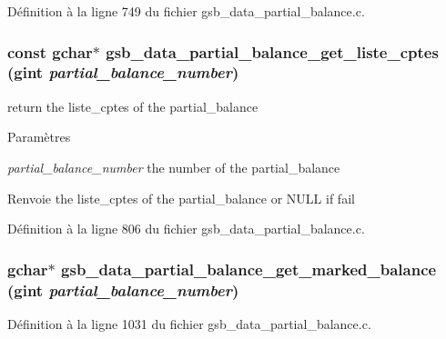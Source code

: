 Définition à la ligne 749 du fichier gsb\_\-data\_\-partial\_\-balance.c.

\subsubsection[{gsb\_\-data\_\-partial\_\-balance\_\-get\_\-liste\_\-cptes}]{\setlength{\rightskip}{0pt plus 5cm}const gchar$\ast$ gsb\_\-data\_\-partial\_\-balance\_\-get\_\-liste\_\-cptes (gint {\em partial\_\-balance\_\-number})}\label{gsb__data__partial__balance_8c_a60c22c649a2f4ff7460ece9208c88bc5}
return the liste\_\-cptes of the partial\_\-balance


\begin{DoxyParams}{Paramètres}
\item[{\em partial\_\-balance\_\-number}]the number of the partial\_\-balance\end{DoxyParams}
\begin{DoxyReturn}{Renvoie}
the liste\_\-cptes of the partial\_\-balance or NULL if fail 
\end{DoxyReturn}


Définition à la ligne 806 du fichier gsb\_\-data\_\-partial\_\-balance.c.

\subsubsection[{gsb\_\-data\_\-partial\_\-balance\_\-get\_\-marked\_\-balance}]{\setlength{\rightskip}{0pt plus 5cm}gchar$\ast$ gsb\_\-data\_\-partial\_\-balance\_\-get\_\-marked\_\-balance (gint {\em partial\_\-balance\_\-number})}\label{gsb__data__partial__balance_8c_afdd82919a412742b289e9ce8c8593138}


Définition à la ligne 1031 du fichier gsb\_\-data\_\-partial\_\-balance.c.

